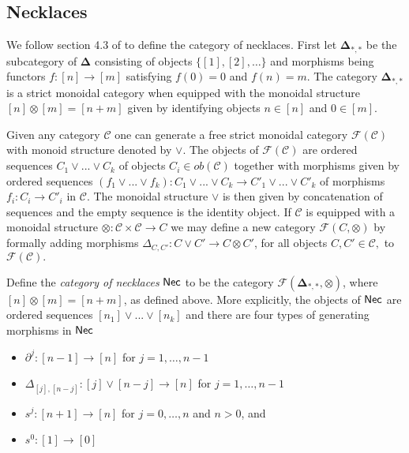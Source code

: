 \subsection{Necklaces} We follow section 4.3 of \cite{Imma, Ralph, Andy} to define the category of necklaces. First let $\mathbf{\Delta}_{*,*}$ be the subcategory of $\mathbf{\Delta}$ consisting of objects $\{ [1], [2],\dots\}$ and morphisms being functors $f \colon [n] \to [m]$ satisfying $f(0)=0$ and $f(n)=m$. The category $\mathbf{\Delta}_{*,*}$ is a strict monoidal category when equipped with the monoidal structure $[n] \otimes [m]= [n+m]$ given by identifying objects $n \in [n]$ and $0 \in [m]$.

Given any category $\mathcal{C}$ one can generate a free strict monoidal category $\mathcal{F}(\mathcal{C})$ with monoid structure denoted by $\vee$. The  objects of $\mathcal{F}(\mathcal{C})$ are ordered sequences $C_1 \vee ... \vee C_k$ of objects $C_i \in ob(\mathcal{C})$ together with morphisms given by ordered sequences $(f_1 \vee ... \vee f_k) \colon C_1 \vee ... \vee C_k \to C'_1 \vee ... \vee C'_k$ of morphisms $f_i \colon C_i \to C'_i$ in $\mathcal{C}.$ The monoidal structure $\vee$ is then given by concatenation of sequences and the empty sequence is the identity object. If $\mathcal{C}$ is equipped with a monoidal structure $\otimes \colon \mathcal{C} \times \mathcal{C} \to C$ we may define a new category $\mathcal{F}(C, \otimes)$ by formally adding morphisms $\Delta_{C,C'} \colon C \vee C' \to C \otimes C'$, for all objects $C, C' \in \mathcal{C},$ to $\mathcal{F}(\mathcal{C}).$
 
Define the \textit{category of necklaces} $\mathsf{Nec}$ to be the category  $\mathcal{F}(\mathbf{\Delta}_{*,*}, \otimes)$, where $[n] \otimes [m]=[n+m]$, as defined above. More explicitly, the objects of $\mathsf{Nec}$ are ordered sequences $[n_1] \vee ... \vee[n_k]$ and there are four types of generating morphisms in $\mathsf{Nec}$
\begin{itemize}
\item $\partial^j \colon [n-1] \to  [n] $
for $j=1,\dots,n-1$
\item $\Delta_{[j],[n-j]} \colon  [j]\vee [n-j] \to [n]$ for $j=1,\dots,n-1$
\item $ s^j \colon [n+1] \to [n]$ for $j=0,\dots,n$ and $n>0$, and 
\item $s^0 \colon [1] \to [0]$
\end{itemize}

